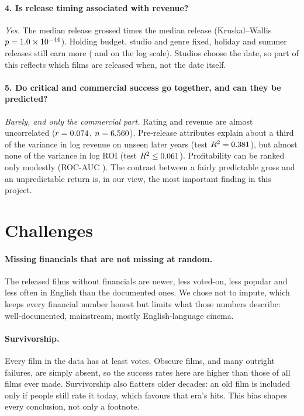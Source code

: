 \documentclass[a4paper,12pt]{report}
\begin{document}
\paragraph{4. Is release timing associated with revenue?} \emph{Yes.} The median \MultiBestMonthName{} release grossed \MultiJuneToSeptemberRatio{} times the median \MultiWorstMonthName{} release (Kruskal--Wallis $p=1.0\times10^{-44}$). Holding budget, studio and genre fixed, holiday and summer releases still earn more (\ModelOlsCoefIsHolidayRelease{} and \ModelOlsCoefIsSummerRelease{} on the log scale). Studios choose the date, so part of this reflects which films are released when, not the date itself.

\paragraph{5. Do critical and commercial success go together, and can they be predicted?} \emph{Barely, and only the commercial part.} Rating and revenue are almost uncorrelated ($r=0.074$, $n=6{,}560$). Pre-release attributes explain about a third of the variance in log revenue on unseen later years (test $R^2=0.381$), but almost none of the variance in log ROI (test $R^2\le0.061$). Profitability can be ranked only modestly (ROC-AUC \ModelClfBestAuc). The contrast between a fairly predictable gross and an unpredictable return is, in our view, the most important finding in this project.

\section{Challenges}\label{sec:challenges}

\paragraph{Missing financials that are not missing at random.} The \CleanMarNUndoc{} released films without financials are newer, less voted-on, less popular and less often in English than the documented ones. We chose not to impute, which keeps every financial number honest but limits what those numbers describe: well-documented, mainstream, mostly English-language cinema.

\paragraph{Survivorship.} Every film in the data has at least \AuditTotalVotesMin{} votes. Obscure films, and many outright failures, are simply absent, so the success rates here are higher than those of all films ever made. Survivorship also flatters older decades: an old film is included only if people still rate it today, which favours that era's hits. This bias shapes every conclusion, not only a footnote.
\end{document}
